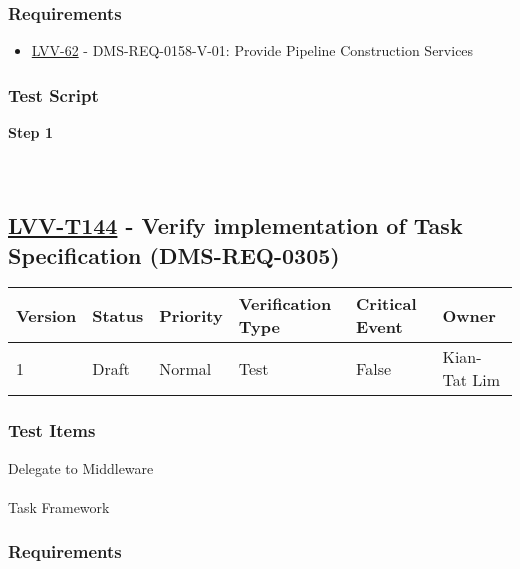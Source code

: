 \hypertarget{requirements-120}{%
\subsubsection{Requirements}\label{requirements-120}}

\begin{itemize}
\tightlist
\item
  \href{https://jira.lsstcorp.org/browse/LVV-62}{LVV-62} -
  DMS-REQ-0158-V-01: Provide Pipeline Construction Services
\end{itemize}

\hypertarget{test-script-120}{%
\subsubsection{Test Script}\label{test-script-120}}

\textbf{Step 1}\\
~\\
~\\

\hypertarget{lvv-t144---verify-implementation-of-task-specification-dms-req-0305}{%
\subsection{\texorpdfstring{\href{https://jira.lsstcorp.org/secure/Tests.jspa\#/testCase/LVV-T144}{LVV-T144}
- Verify implementation of Task Specification
(DMS-REQ-0305)}{LVV-T144 - Verify implementation of Task Specification (DMS-REQ-0305)}}\label{lvv-t144---verify-implementation-of-task-specification-dms-req-0305}}

\begin{longtable}[]{@{}llllll@{}}
\toprule
Version & Status & Priority & Verification Type & Critical Event &
Owner\tabularnewline
\midrule
\endhead
1 & Draft & Normal & Test & False & Kian-Tat Lim\tabularnewline
\bottomrule
\end{longtable}

\hypertarget{test-items-120}{%
\subsubsection{Test Items}\label{test-items-120}}

Delegate to Middleware\\
~\\
Task Framework

\hypertarget{requirements-121}{%
\subsubsection{Requirements}\label{requirements-121}}

